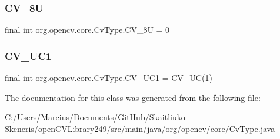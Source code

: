 \subsubsection{\texorpdfstring{C\+V\+\_\+8U}{CV\_8U}}
{\footnotesize\ttfamily final int org.\+opencv.\+core.\+Cv\+Type.\+C\+V\+\_\+8U = 0\hspace{0.3cm}{\ttfamily [static]}}

\mbox{\label{classorg_1_1opencv_1_1core_1_1_cv_type_a385128a12079659d6b7a7ef4dd63836e}} 
\subsubsection{\texorpdfstring{C\+V\+\_\+U\+C1}{CV\_8UC1}}
{\footnotesize\ttfamily final int org.\+opencv.\+core.\+Cv\+Type.\+C\+V\+\_\+U\+C1 = \mbox{\hyperlink{classorg_1_1opencv_1_1core_1_1_cv_type_ac747e0c4781d8cd6549d7526c8239aa4}{C\+V\+\_\+UC}}(1)\hspace{0.3cm}{\ttfamily [static]}}



The documentation for this class was generated from the following file\+:\begin{DoxyCompactItemize}
\item 
C\+:/\+Users/\+Marcius/\+Documents/\+Git\+Hub/\+Skaitliuko-\/\+Skeneris/open\+C\+V\+Library249/src/main/java/org/opencv/core/\mbox{\hyperlink{_cv_type_8java}{Cv\+Type.\+java}}\end{DoxyCompactItemize}

